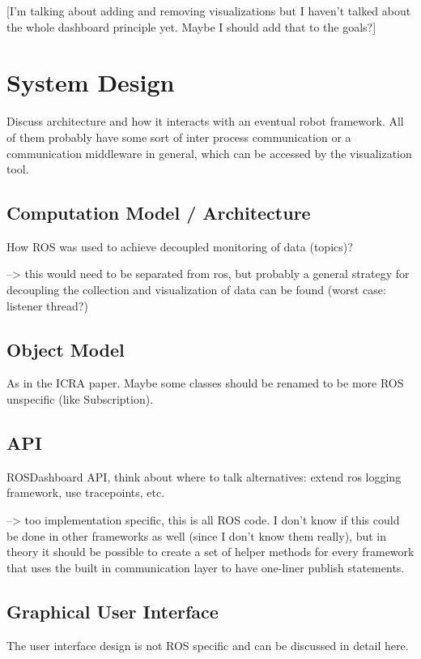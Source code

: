 [I'm talking about adding and removing visualizations but I haven't talked about the whole dashboard principle yet. Maybe I should add that to the goals?]

\section{System Design}
Discuss architecture and how it interacts with an eventual robot framework. All of them probably have some sort of inter process communication or a communication middleware in general, which can be accessed by the visualization tool.

\subsection{Computation Model / Architecture}
How ROS was used to achieve decoupled monitoring of data (topics)?

--> this would need to be separated from ros, but probably a general strategy for decoupling the collection and visualization of data can be found (worst case: listener thread?)

\subsection{Object Model}
As in the ICRA paper. Maybe some classes should be renamed to be more ROS unspecific (like Subscription).

\subsection{API}
ROSDashboard API, think about where to talk alternatives: extend ros logging framework, use tracepoints, etc.

--> too implementation specific, this is all ROS code. I don't know if this could be done in other frameworks as well (since I don't know them really), but in theory it should be possible to create a set of helper methods for every framework that uses the built in communication layer to have one-liner publish statements.
\subsection{Graphical User Interface}
The user interface design is not ROS specific and can be discussed in detail here.
